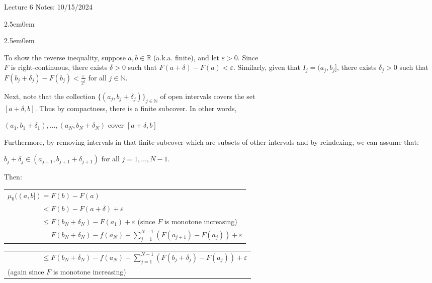\documentclass{book}
\newcommand{\hTwo}{%
\color{MidnightBlue}%
   \fontsize{13}{15}\selectfont%
}
\newcommand{\hFour}{%
   \color{Cyan!80!black}
   \fontsize{12}{14}\selectfont%
}
\newcommand{\teachComment}{
   \color{Orange}%
   \fontsize{12}{14}\selectfont%
}
\newenvironment{myIndent}{%
   \begin{adjustwidth}{2.5em}{0em}%
}{%
   \end{adjustwidth}%
}
\newcommand{\retTwo}{\hfill\bigbreak}
\newcommand{\mHeader}[1]{{
   \color{Black}%
   \fontsize{20}{18}\selectfont%
   #1\retTwo
}}
\begin{document}
\mHeader{Lecture 6 Notes: 10/15/2024}

\begin{myIndent}\hTwo
   \begin{myIndent}\hFour
      To show the reverse inequality, suppose $a, b \in \mathbb{R}$ (a.k.a. finite), and let $\varepsilon > 0$. Since\\ $F$ is right-continuous, there exists $\delta > 0$ such that $F(a + \delta) - F(a) < \varepsilon$. Similarly, given that $I_j = (a_j, b_j]$, there exists $\delta_j > 0$ such that $F(b_j + \delta_j) - F(b_j) < \frac{\varepsilon}{2^j}$ for all $j \in \mathbb{N}$.\retTwo

      Next, note that the collection $\{ (a_j, b_j + \delta_j) \}_{j \in \mathbb{N}}$ of open intervals covers the set\\ $[a + \delta, b]$. Thus by compactness, there is a finite subcover. In other words,
      
      {\centering $(a_1, b_1 + \delta_1),\ldots,(a_N, b_N + \delta_N)$ cover $[a + \delta, b]$ \retTwo\par}
      
      Furthermore, by removing intervals in that finite subcover which are subsets of other intervals and by reindexing, we can assume that:

      {\centering $b_j + \delta_j \in (a_{j+1}, b_{j+1} + \delta_{j+1})$ for all $j = 1, \ldots, N - 1$. \retTwo\par}

      Then:

      {\centering 
      \begin{tabular}{l}
         $\mu_0((a, b]) = F(b) - F(a)$\\
         $\phantom{\mu_0((a, b])} < F(b) - F(a + \delta) + \varepsilon$\\
         $\phantom{\mu_0((a, b])} \leq F(b_N + \delta_N) - F(a_1) + \varepsilon$\phantom{aaaaaaa} {\teachComment(since $F$ is monotone increasing)}\\ [6pt]

         $\phantom{\mu_0((a, b])} = F(b_N + \delta_N) - f(a_N) + \sum\limits_{j=1}^{N-1}(F(a_{j+1}) - F(a_j)) + \varepsilon$\\ [14pt]
		\end{tabular}\newpage
		\begin{tabular}{l}

         $\phantom{\mu_0((a, b])} \leq F(b_N + \delta_N) - f(a_N) + \sum\limits_{j=1}^{N-1}(F(b_j + \delta_j) - F(a_j)) + \varepsilon$\\ [-6pt]
         \phantom{aaaaaaaaaaaaaaaaaaaaaaaaaaaaaaaaaaa} {\teachComment(again since $F$ is monotone increasing)}\\ [0pt]


\end{tabular}}
\end{myIndent}
\end{myIndent}
\end{document}
